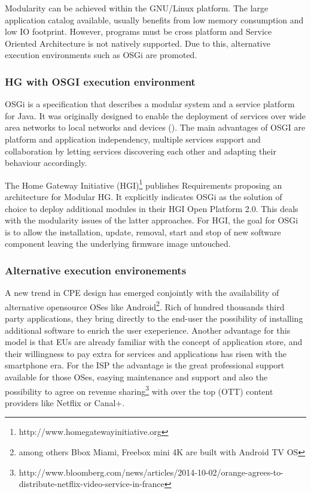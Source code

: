 Modularity can be achieved within the GNU/Linux platform.
The large application catalog available, usually benefits from low memory consumption and low IO footprint.
However, programs must be cross platform and Service Oriented Architecture is not natively supported.
Due to this, alternative execution environments such as OSGi are promoted.


   
\subsubsection{HG with OSGI execution environment}
   
OSGi is a specification that describes a modular system and a service platform for Java.
It was originally designed to enable the deployment of services over wide area networks to local networks and devices (\cite{marples_open_2001}).
The main advantages of OSGI are platform and application independency, multiple services support and collaboration by letting services discovering each other and adapting their behaviour accordingly.

The Home Gateway Initiative (HGI)\footnote{http://www.homegatewayinitiative.org} publishes Requirements \cite{_requirements_2011} \cite{_hg_2014} proposing an architecture for Modular HG.
It explicitly indicates OSGi as the solution of choice to deploy additional modules in their HGI Open Platform 2.0.
This deals with the modularity issues of the latter approaches.
For HGI, the goal for OSGi is to allow the installation, update, removal, start and stop of new software component leaving the underlying firmware image untouched.

\subsubsection{Alternative execution environements}

A new trend in CPE design has emerged conjointly with the availability of alternative opensource OSes like Android\footnote{among others Bbox Miami, Freebox mini 4K are built with Android TV OS}.
Rich of hundred thousands third party applications, they bring directly to the end-user the possibility of installing additional software to enrich the user exeperience.
Another advantage for this model is that EUs are already familiar with the concept of application store, and their willingness to pay extra for services and applications has risen with the smartphone era.
For the ISP the advantage is the great professional support available for those OSes, easying maintenance and support and also the possibility to agree on revenue sharing\footnote{http://www.bloomberg.com/news/articles/2014-10-02/orange-agrees-to-distribute-netflix-video-service-in-france} with over the top (OTT) content providers like Netflix or Canal+.

